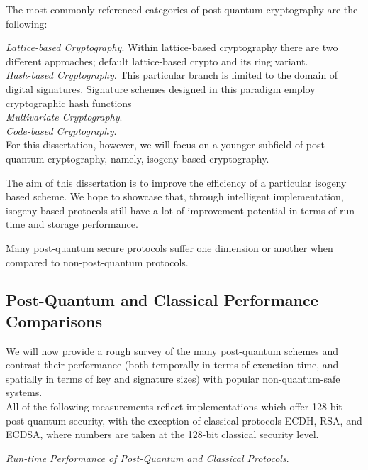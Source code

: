 The most commonly referenced categories of post-quantum cryptography are the following:

\noindent
\textit{Lattice-based Cryptography}. Within lattice-based cryptography there are two different approaches; default lattice-based crypto and its ring variant. \\

\noindent
\textit{Hash-based Cryptography}. This particular branch is limited to the domain of digital signatures. Signature schemes designed in this paradigm employ cryptographic hash functions \\

\noindent
\textit{Multivariate Cryptography}.\\

\noindent
\textit{Code-based Cryptography}.\\

For this dissertation, however, we will focus on a younger subfield of post-quantum cryptography, namely, isogeny-based cryptography. 

The aim of this dissertation is to improve the efficiency of a particular isogeny based scheme. We hope to showcase that, through intelligent implementation, isogeny based protocols still have a lot of improvement potential in terms of run-time and storage performance. 

Many post-quantum secure protocols suffer one dimension or another when compared to non-post-quantum protocols.

\subsection{Post-Quantum and Classical Performance Comparisons}

We will now provide a rough survey of the many post-quantum schemes and contrast their performance (both temporally in terms of exeuction time, and spatially in terms of key and signature sizes) with popular non-quantum-safe systems.\\

All of the following measurements reflect implementations which offer 128 bit post-quantum security, with the exception of classical protocols ECDH, RSA, and ECDSA, where numbers are taken at the 128-bit classical security level.

\noindent
\textit{Run-time Performance of Post-Quantum and Classical Protocols}.

